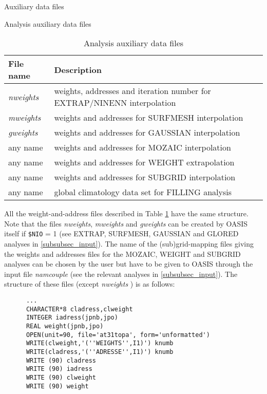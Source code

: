 \begin{subsection}{Auxiliary data files}
\begin{subsubsection}{Analysis auxiliary data files}
\begin{table}[hbtp]
\begin{center}
\begin{tabular}{|l|l|}
\hline
File name & Description \\
\hline
\hline
{\em  nweights }& weights, addresses and iteration number for EXTRAP/NINENN interpolation  \\
{\em  mweights }& weights and addresses for SURFMESH interpolation  \\
{\em  gweights }& weights and addresses for GAUSSIAN interpolation  \\
any name        & weights and addresses for MOZAIC interpolation \\
any name        & weights and addresses for WEIGHT extrapolation \\
any name        & weights and addresses for SUBGRID interpolation \\
any name        & global climatology data set for FILLING analysis \\
\hline
\end{tabular}
\end{center}
\caption{Analysis auxiliary data files}
\label{tab.fileana}
\end{table}

All the weight-and-address files described in Table \ref{tab.fileana}
have the same structure.
Note that the files {\em  nweights}, {\em  mweights} and {\em
gweights} can be created by
OASIS itself if {\tt \$NIO} = 1 (see EXTRAP, SURFMESH, GAUSSIAN 
and GLORED analyses in 
\ref{subsubsec_input}). The name of the (sub)grid-mapping files giving
the weights and addresses files for
the MOZAIC, WEIGHT and SUBGRID analyses can be chosen by the user but
have to be given to OASIS through the input file {\em namcouple} (see
the relevant analyses in \ref{subsubsec_input}). The structure of
these files (except {\em  nweights }) is as follows:

\begin{verbatim}
      ...
      CHARACTER*8 cladress,clweight
      INTEGER iadress(jpnb,jpo)
      REAL weight(jpnb,jpo)
      OPEN(unit=90, file='at31topa', form='unformatted')
      WRITE(clweight,'(''WEIGHTS'',I1)') knumb
      WRITE(cladress,'(''ADRESSE'',I1)') knumb
      WRITE (90) cladress
      WRITE (90) iadress
      WRITE (90) clweight
      WRITE (90) weight
\end{verbatim}


\end{subsubsection}
\end{subsection}
